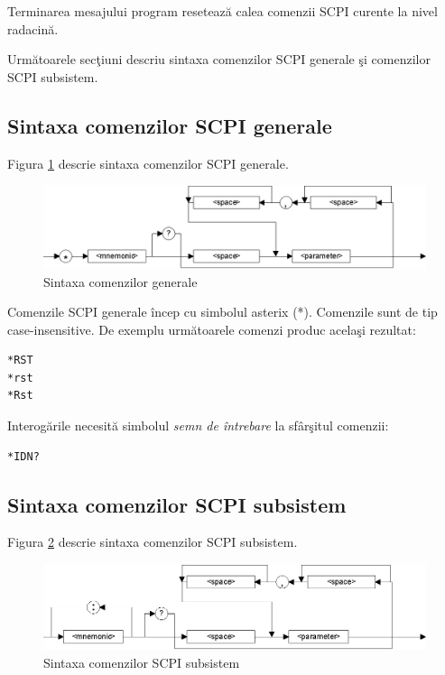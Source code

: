 Terminarea mesajului program reseteaz\u{a} calea comenzii SCPI curente la nivel radacin\u{a}.

Urm\u{a}toarele sec\c{t}iuni descriu sintaxa comenzilor SCPI generale \c{s}i comenzilor SCPI subsistem.

\subsection{Sintaxa comenzilor SCPI generale}
Figura \ref{fig2} descrie sintaxa comenzilor SCPI generale.

\begin{figure}[htp]
 \centering
 \includegraphics[scale=0.8]{Figuri/fig2_scpi_meas.eps}
 \caption{Sintaxa comenzilor generale}
 \label{fig2}
\end{figure}

Comenzile SCPI generale \^{i}ncep cu simbolul asterix (*). Comenzile sunt de tip case-insensitive. De exemplu urm\u{a}toarele comenzi produc acela\c{s}i rezultat:
\begin{verbatim}
*RST
*rst
*Rst
\end{verbatim}

Interog\u{a}rile necesit\u{a} simbolul \emph{semn de \^{i}ntrebare} la sf\^{a}r\c{s}itul comenzii:
\begin{verbatim}
*IDN?
\end{verbatim}

\subsection{Sintaxa comenzilor SCPI subsistem}
Figura \ref{fig3} descrie sintaxa comenzilor SCPI subsistem.

\begin{figure}[htp]
 \centering
 \includegraphics[scale=0.8]{Figuri/fig3_scpi_meas.eps}
 \caption{Sintaxa comenzilor SCPI subsistem}
 \label{fig3}
\end{figure}

